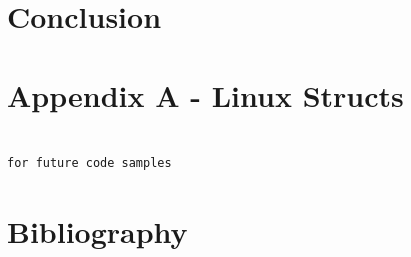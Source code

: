 \documentclass[10pt,letterpaper,onecolumn,draftclsnofoot]{IEEEtran}
\begin{document}
\section{Conclusion}

\clearpage
\section{Appendix A - Linux Structs}

\begin{lstlisting}

for future code samples

\end{lstlisting}

\section{Bibliography}


\end{document}
